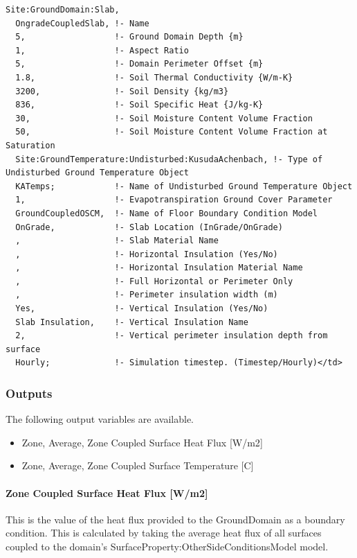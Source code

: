 \begin{lstlisting}
Site:GroundDomain:Slab,
  OngradeCoupledSlab, !- Name
  5,                  !- Ground Domain Depth {m}
  1,                  !- Aspect Ratio
  5,                  !- Domain Perimeter Offset {m}
  1.8,                !- Soil Thermal Conductivity {W/m-K}
  3200,               !- Soil Density {kg/m3}
  836,                !- Soil Specific Heat {J/kg-K}
  30,                 !- Soil Moisture Content Volume Fraction
  50,                 !- Soil Moisture Content Volume Fraction at Saturation
  Site:GroundTemperature:Undisturbed:KusudaAchenbach, !- Type of Undisturbed Ground Temperature Object
  KATemps;            !- Name of Undisturbed Ground Temperature Object
  1,                  !- Evapotranspiration Ground Cover Parameter
  GroundCoupledOSCM,  !- Name of Floor Boundary Condition Model
  OnGrade,            !- Slab Location (InGrade/OnGrade)
  ,                   !- Slab Material Name
  ,                   !- Horizontal Insulation (Yes/No)
  ,                   !- Horizontal Insulation Material Name
  ,                   !- Full Horizontal or Perimeter Only
  ,                   !- Perimeter insulation width (m)
  Yes,                !- Vertical Insulation (Yes/No)
  Slab Insulation,    !- Vertical Insulation Name
  2,                  !- Vertical perimeter insulation depth from surface
  Hourly;             !- Simulation timestep. (Timestep/Hourly)</td>
\end{lstlisting}

\subsubsection{Outputs}\label{outputs-1-015}

The following output variables are available.

\begin{itemize}
\tightlist
\item
  Zone, Average, Zone Coupled Surface Heat Flux {[}W/m2{]}
\item
  Zone, Average, Zone Coupled Surface Temperature {[}C{]}
\end{itemize}

\paragraph{Zone Coupled Surface Heat Flux {[}W/m2{]}}\label{zone-coupled-surface-heat-flux-wm2}

This is the value of the heat flux provided to the GroundDomain as a boundary condition. This is calculated by taking the average heat flux of all surfaces coupled to the domain's SurfaceProperty:OtherSideConditionsModel model.

